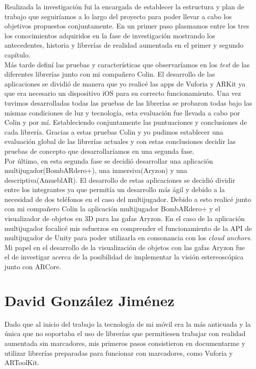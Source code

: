 Realizada la investigación fui la encargada de establecer la estructura y plan de trabajo que seguiríamos a lo largo del proyecto para poder llevar a cabo los objetivos propuestos conjuntamente. En un primer paso plasmamos entre los tres los conocimientos adquiridos en la fase de investigación mostrando los antecedentes, historia y librerías de realidad aumentada en el primer y segundo capítulo.\\

Más tarde definí las pruebas y características que observaríamos en los \textit{test} de las diferentes librerías junto con mi compañero Colin. El desarrollo de las aplicaciones se dividió de manera que yo realicé las apps de Vuforia y ARKit ya que era necesario un dispositivo iOS para su correcto funcionamiento. Una vez tuvimos desarrolladas todas las pruebas de las librerías se probaron todas bajo las mismas condiciones de luz y tecnología, esta evaluación fue llevada a cabo por Colin y por mí. Estableciendo conjuntamente las puntuaciones y conclusiones de cada librería. Gracias a estas pruebas Colin y yo pudimos establecer una evaluación global de las librerías actuales y con estas conclusiones decidir las pruebas de concepto que desarrollaríamos en una segunda fase.\\

Por último, en esta segunda fase se decidió desarrollar una aplicación multijugador(BombARdero+), una inmersiva(Aryzon) y una descriptiva(AmueblAR). El desarrollo de estas aplicaciones se decidió dividir entre los integrantes ya que permitía un desarrollo más ágil y debido a la necesidad de dos teléfonos en el caso del multijugador. Debido a esto realicé junto con mi compañero Colin la aplicación multijugador BombARdero+ y el visualizador de objetos en 3D para las gafas Aryzon. En el caso de la aplicación multijugador focalicé mis esfuerzos en comprender el funcionamiento de la API de multijugador de Unity para poder utilizarla en consonancia con los \textit{cloud anchors}. Mi papel en el desarrollo de la visualización de objetos con las gafas Aryzon fue el de investigar acerca de la posibilidad de implementar la visión estereoscópica junto con ARCore.


\newpage
\section{David González Jiménez}
Dado que al inicio del trabajo la tecnología de mi móvil era la más anticuada y la única que no soportaba el uso de librerías que permitiesen trabajar con realidad aumentada sin marcadores, mis primeros pasos consistieron en documentarme y utilizar librerías preparadas para funcionar con marcadores, como Vuforia y ARToolKit.\\

